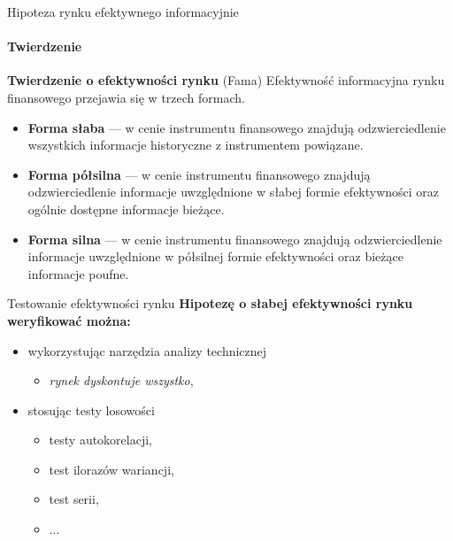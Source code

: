 \documentclass[a4paper, 11pt]{beamer}
\begin{document}
	\begin{frame}{Hipoteza rynku efektywnego informacyjnie}
		\framesubtitle{Twierdzenie}
		\begin{block}{\textbf{Twierdzenie o efektywności rynku} (Fama)}
			Efektywność informacyjna rynku finansowego przejawia się w trzech formach.
			\begin{itemize}
				\item \textbf{Forma słaba} --- w cenie instrumentu finansowego znajdują
					odzwierciedlenie wszystkich informacje historyczne z instrumentem powiązane.
				\item \textbf{Forma półsilna} --- w cenie instrumentu finansowego znajdują
					odzwierciedlenie informacje uwzględnione w słabej formie efektywności oraz
					ogólnie dostępne informacje bieżące.
				\item \textbf{Forma silna} --- w cenie instrumentu finansowego znajdują
					odzwierciedlenie informacje uwzględnione w półsilnej formie efektywności oraz
					bieżące informacje poufne.
			\end{itemize}
		\end{block}
	\end{frame}
	
	\begin{frame}{Testowanie efektywności rynku}
		\textbf{Hipotezę o słabej efektywności rynku weryfikować można:}
		\begin{itemize}
			\item wykorzystując narzędzia analizy technicznej
			\begin{itemize}
				\item \textit{rynek dyskontuje wszystko},
			\end{itemize}
			\item stosując testy losowości
			\begin{itemize}
				\item testy autokorelacji,
				\item test ilorazów wariancji,
				\item test serii,
				\item ...
			\end{itemize}
		\end{itemize}
	\end{frame}
	
\end{document}
